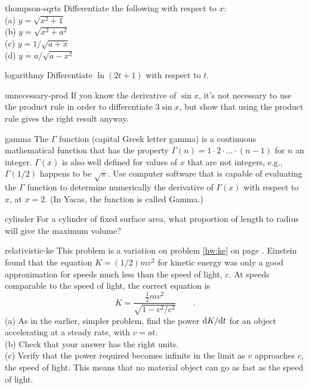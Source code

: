 \begin{hwsection}
\begin{hwwithsoln}{thompson-sqrts}
Differentiate the following with respect to $x$:\\
(a) $y=\sqrt{x^2+1}$ \\
(b) $y=\sqrt{x^2+a^2}$ \\
(c) $y=1/\sqrt{a+x}$ \\
(d) $y=a/\sqrt{a-x^2}$ \\
 \thompson
\end{hwwithsoln}

\begin{hwwithsoln}{logarithmy}
Differentiate $\ln(2t+1)$ with respect to $t$.
\end{hwwithsoln}

\begin{hwwithsoln}{unnecessary-prod}
If you know the derivative of $\sin x$, it's not necessary to use the product rule in order
to differentiate $3\sin x$, but show that using the product rule gives the right result anyway.
\end{hwwithsoln}

\begin{hwwithsoln}{gamma}
The $\Gamma$ function (capital Greek letter gamma) is a continuous mathematical function that
has the property $\Gamma(n)=1\cdot2\cdot\ldots\cdot(n-1)$ for $n$ an integer. $\Gamma(x)$ is also well
defined for values of $x$ that are not integers, e.g., $\Gamma(1/2)$ happens to be $\sqrt{\pi}$.
Use computer software that is capable of evaluating the $\Gamma$ function to determine numerically
the derivative of $\Gamma(x)$ with respect to $x$, at $x=2$. (In Yacas, the function is called Gamma.)
\end{hwwithsoln}

\begin{hwwithsoln}{cylinder}
For a cylinder of fixed surface area, what proportion of length to radius will give the maximum volume?
\end{hwwithsoln}

\begin{hwwithsoln}{relativistic-ke}
This problem is a variation on problem \ref{hw:ke} on page \pageref{hw:ke}. Einstein found that the
equation $K=(1/2)mv^2$ for kinetic energy was only a good approximation for speeds much less than
the speed of light, $c$. At speeds comparable to the speed of light, the correct equation is
\begin{equation*}
  K = \frac{\frac{1}{2}mv^2}{\sqrt{1-v^2/c^2}} \qquad .
\end{equation*}
(a) As in the earlier, simpler problem, find the power $\textup{d} K/\textup{d} t$ for an object accelerating
at a steady rate, with $v=at$. \\
(b) Check that your answer has the right units.\\
(c) Verify that the power required becomes infinite in the limit as $v$ approaches $c$, the speed of
light. This means that no material object can go as fast as the speed of light.
\end{hwwithsoln}


\end{hwsection}
